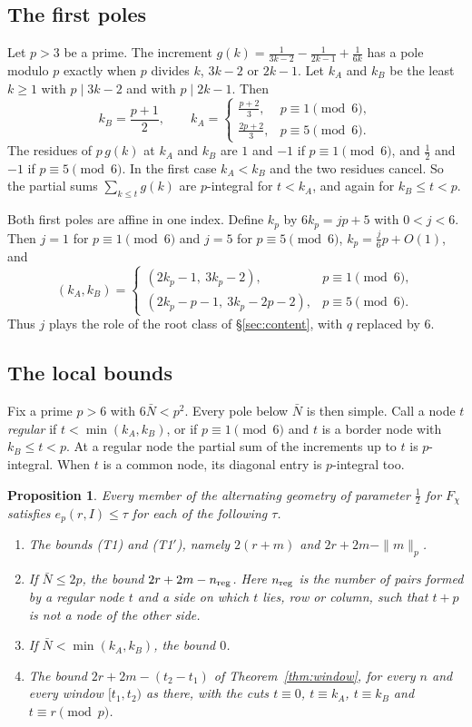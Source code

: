 \documentclass[11pt]{amsart}
\newtheorem{proposition}[theorem]{Proposition}
\theoremstyle{definition}
\theoremstyle{remark}
\numberwithin{equation}{section}
\begin{document}
\subsection{The first poles}
Let $p>3$ be a prime. The increment $g(k)=\frac1{3k-2}-\frac1{2k-1}+\frac1{6k}$ has a pole modulo $p$ exactly when $p$
divides $k$, $3k-2$ or $2k-1$. Let $k_A$ and $k_B$ be the least $k\ge1$ with $p\mid3k-2$ and with $p\mid2k-1$. Then
\[
 k_B=\frac{p+1}2,\qquad
 k_A=\begin{cases}\frac{p+2}3,&p\equiv1\pmod6,\\[3pt]\frac{2p+2}3,&p\equiv5\pmod6.\end{cases}
\]
The residues of $p\,g(k)$ at $k_A$ and $k_B$ are $1$ and $-1$ if $p\equiv1\pmod6$, and $\frac12$ and $-1$ if
$p\equiv5\pmod6$. In the first case $k_A<k_B$ and the two residues cancel. So the partial sums $\sum_{k\le t}g(k)$ are
$p$-integral for $t<k_A$, and again for $k_B\le t<p$.

Both first poles are affine in one index. Define $k_p$ by $6k_p=jp+5$ with $0<j<6$. Then $j=1$ for $p\equiv1\pmod6$ and
$j=5$ for $p\equiv5\pmod6$, $k_p=\frac j6p+O(1)$, and
\[
 (k_A,k_B)=\begin{cases}(2k_p-1,\ 3k_p-2),&p\equiv1\pmod6,\\[2pt](2k_p-p-1,\ 3k_p-2p-2),&p\equiv5\pmod6.\end{cases}
\]
Thus $j$ plays the role of the root class of \S\ref{sec:content}, with $q$ replaced by $6$.

\subsection{The local bounds}
Fix a prime $p>6$ with $6\bar N<p^2$. Every pole below $\bar N$ is then simple. Call a node $t$ \emph{regular} if
$t<\min(k_A,k_B)$, or if $p\equiv1\pmod6$ and $t$ is a border node with $k_B\le t<p$. At a regular node the partial sum
of the increments up to $t$ is $p$-integral. When $t$ is a common node, its diagonal entry is $p$-integral too.

\begin{proposition}\label{prop:chi3-local}
Every member of the alternating geometry of parameter $\frac12$ for $F_\chi$ satisfies $e_p(r,I)\le\tau$ for each of the
following $\tau$.
\begin{enumerate}[label=(\roman*),leftmargin=*]
\item The bounds (T1) and (T1$'$), namely $2(r+m)$ and $2r+2m-\|m\|_p$.
\item If $\bar N\le2p$, the bound $2r+2m-n_{\rm reg}$. Here $n_{\rm reg}$ is the number of pairs formed by a regular node $t$
 and a side on which $t$ lies, row or column, such that $t+p$ is not a node of the other side.
\item If $\bar N<\min(k_A,k_B)$, the bound $0$.
\item The bound $2r+2m-(t_2-t_1)$ of Theorem~\ref{thm:window}, for every $n$ and every window $[t_1,t_2)$ as there, with
 the cuts $t\equiv0$, $t\equiv k_A$, $t\equiv k_B$ and $t\equiv r\pmod p$.
\end{enumerate}
\end{proposition}
\end{document}
